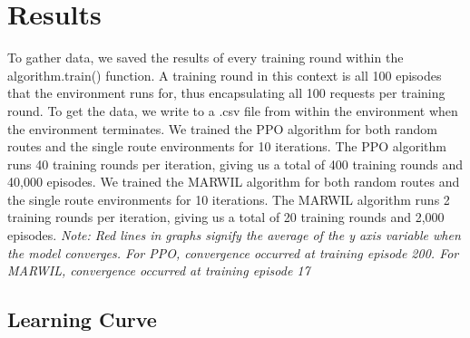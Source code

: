 \documentclass[conference]{IEEEtran}
\begin{document}
\section{Results}
\begin{flushleft}
To gather data, we saved the results of every training round within the algorithm.train() function. A training round in this context is all 100 episodes that the environment runs for, thus encapsulating all 100 requests per training round. To get the data, we write to a .csv file from within the environment when the environment terminates.
\newline \newline 
We trained the PPO algorithm for both random routes and the single route environments for 10 iterations. The PPO algorithm runs 40 training rounds per iteration, giving us a total of 400 training rounds and 40,000 episodes.
\newline \newline
We trained the MARWIL algorithm for both random routes and the single route environments for 10 iterations. The MARWIL algorithm runs 2 training rounds per iteration, giving us a total of 20 training rounds and 2,000 episodes.
\newline \newline
\textit{Note: Red lines in graphs signify the average of the y axis variable when the model converges. For PPO, convergence occurred at training episode 200. For MARWIL, convergence occurred at training episode 17}
\end{flushleft}
\subsection{Learning Curve}
\end{document}
